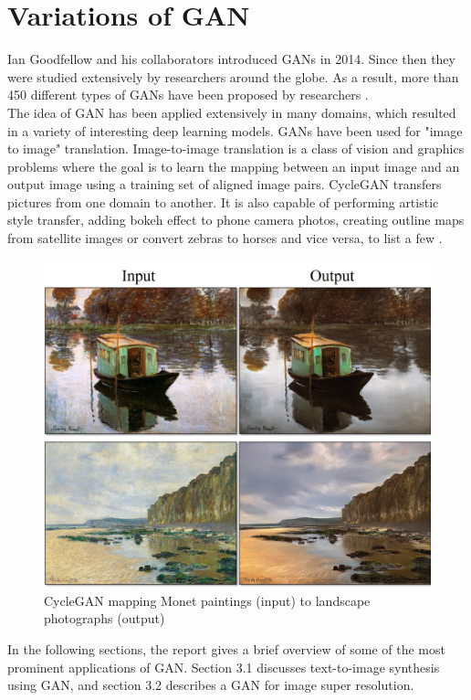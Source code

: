 \chapter{Variations of GAN}
\begin{onehalfspace}
    Ian Goodfellow and his collaborators introduced GANs in 2014. Since then 
    they were studied extensively by researchers around the globe. As a result, 
    more than 450 different types of GANs have been proposed by 
    researchers \cite{gan_list}. \\
    The idea of GAN has been applied extensively in many domains, which 
    resulted in a variety of interesting deep learning models. GANs have been 
    used for "image to image" translation. Image-to-image translation is a 
    class of vision and graphics problems where the goal is to learn the 
    mapping between an input image and an output image using a training set of 
    aligned image pairs. CycleGAN \cite{CycleGAN2017} transfers pictures from 
    one domain to another. 
    It is also capable of performing artistic style transfer, adding bokeh 
    effect to phone camera photos, creating outline maps from satellite images 
    or convert zebras to horses and vice versa, to list a few 
    \cite{cycleganprojectpage}.

    \begin{figure}[h]
        \caption{CycleGAN mapping Monet paintings (input) to landscape photographs (output)
        \cite{cycleganprojectpage}}
        \centering
        \includegraphics[width=0.6\linewidth]{images/painting2photo.jpg}
    \end{figure} 

    In the following sections, the report gives a brief overview of 
    some of the most prominent applications of GAN. Section 3.1 discusses 
    text-to-image synthesis using GAN, and section 3.2 describes a GAN for 
    image super resolution.


\end{onehalfspace}
